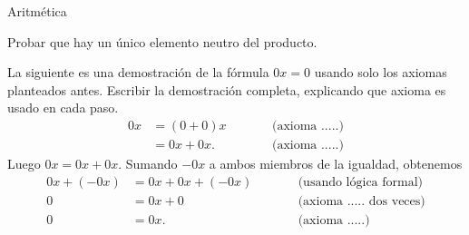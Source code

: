 \begin{section}{Aritmética}
\begin{enumex}
\item \label{ej-elem-neutro-prod} Probar que hay un único elemento neutro del producto.

\item \label{ej0a}
La siguiente es una demostración de la fórmula $0x=0$ usando solo los axiomas planteados antes. Escribir la demostración completa, explicando que axioma es usado en cada paso.
$$\begin{aligned}
0x &= (0+0)x &\qquad &\mbox{(axioma .....)}\\  
&=0x+0x. &\qquad &\mbox{(axioma .....)}
\end{aligned}$$
Luego $0x =0x+0x$. Sumando $-0x$ a ambos miembros de la igualdad, obtenemos 
$$\begin{aligned}
0x +(-0x) &= 0x+0x+(-0x) &\qquad &\mbox{(usando lógica formal)}\\  
0 &= 0x+0 &\qquad &\mbox{(axioma .....  dos veces)}\\  
0 &=0x. &\qquad &\mbox{(axioma .....)}
\end{aligned}$$

\end{enumex}

\end{section}



